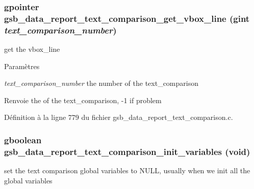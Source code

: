\subsubsection[{gsb\_\-data\_\-report\_\-text\_\-comparison\_\-get\_\-vbox\_\-line}]{\setlength{\rightskip}{0pt plus 5cm}gpointer gsb\_\-data\_\-report\_\-text\_\-comparison\_\-get\_\-vbox\_\-line (gint {\em text\_\-comparison\_\-number})}\label{gsb__data__report__text__comparison_8c_a98e92783c34e4f3292adf3df1ac8fe4d}
get the vbox\_\-line


\begin{DoxyParams}{Paramètres}
\item[{\em text\_\-comparison\_\-number}]the number of the text\_\-comparison\end{DoxyParams}
\begin{DoxyReturn}{Renvoie}
the of the text\_\-comparison, -\/1 if problem 
\end{DoxyReturn}


Définition à la ligne 779 du fichier gsb\_\-data\_\-report\_\-text\_\-comparison.c.

\subsubsection[{gsb\_\-data\_\-report\_\-text\_\-comparison\_\-init\_\-variables}]{\setlength{\rightskip}{0pt plus 5cm}gboolean gsb\_\-data\_\-report\_\-text\_\-comparison\_\-init\_\-variables (void)}\label{gsb__data__report__text__comparison_8c_a882c29293e2fac42bdd3652b5e320b19}
set the text comparison global variables to NULL, usually when we init all the global variables


